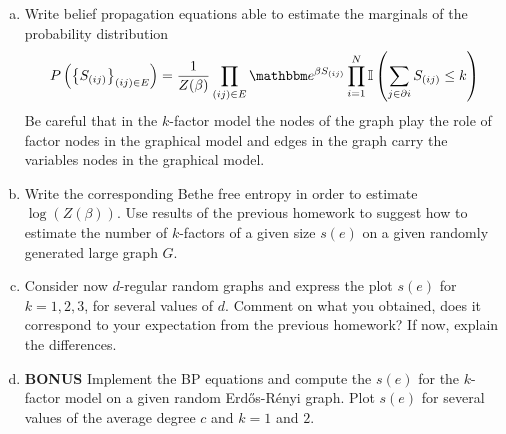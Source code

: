 \documentclass[a4paper,oneside,12pt]{article}
\begin{document}
\begin{enumerate}[(a)]
\item 
        Write belief propagation equations able to estimate the marginals of the probability distribution
        \begin{equation*}
            P \rdbrs{ \clbrs{ S_{(ij)} }_{(ij) \in E} }
            = \frac{1}{Z(\beta)} \prod_{(ij) \in E} \ee^{\beta S_{(ij)}} \prod_{i=1}^N \mathbb{I} \rdbrs{ \sum_{j \in \partial i} S_{(ij)} \le k }
        \end{equation*}
        Be careful that in the $ k $-factor model the nodes of the graph play the role of factor nodes in the graphical model and edges in the graph carry the variables nodes in the graphical model. 
\item 
        Write the corresponding Bethe free entropy in order to estimate $ \log (Z(\beta)) $. 
        Use results of the previous homework to suggest how to estimate the number of $ k $-factors of a given size $ s(e) $ on a given randomly generated large graph $ G $. 
\item  
        Consider now $ d $-regular random graphs and express the plot $ s(e) $ for $ k = 1,2,3 $, for several values of $ d $.
        Comment on what you obtained, does it correspond to your expectation from the previous homework?
        If now, explain the differences.
\item 
        \textbf{BONUS} Implement the BP equations and compute the $ s(e) $ for the $ k $-factor model on a given random Erd\H{o}s-R\'{e}nyi graph.
        Plot $ s(e) $ for several values of the average degree $ c $ and $ k = 1 $ and $ 2 $.
\end{enumerate}
\end{document}
